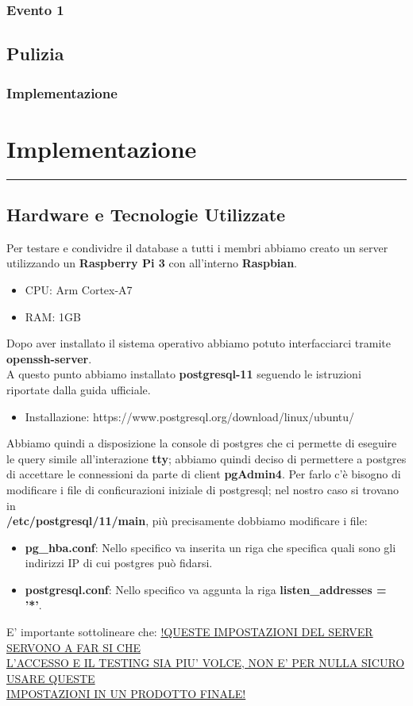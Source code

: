 \documentclass[legalpaper]{article}
\begin{document}
\subsubsection{Evento 1}
\subsection{Pulizia}
\subsubsection{Implementazione}
\newpage

\section{Implementazione}
\rule{\linewidth}{1.5pt}
\subsection{Hardware e Tecnologie Utilizzate}
Per testare e condividre il database a tutti i membri abbiamo creato un server utilizzando un \textbf{Raspberry Pi 3} con all'interno \textbf{Raspbian}.
\begin{itemize}
	\item CPU: Arm Cortex-A7
	\item RAM: 1GB
\end{itemize}
Dopo aver installato il sistema operativo abbiamo potuto interfacciarci tramite \textbf{openssh-server}.\\
A questo punto abbiamo installato \textbf{postgresql-11} seguendo le istruzioni riportate dalla guida ufficiale.
\begin{itemize}
	\item Installazione: https://www.postgresql.org/download/linux/ubuntu/
\end{itemize}
Abbiamo quindi a disposizione la console di postgres che ci permette di eseguire le query simile all'interazione \textbf{tty}; abbiamo quindi deciso di permettere a postgres di accettare le connessioni
da parte di client \textbf{pgAdmin4}.\newline
Per farlo c'è bisogno di modificare i file di conficurazioni iniziale di postgresql; nel nostro caso si trovano in \\ \textbf{/etc/postgresql/11/main},
più precisamente dobbiamo modificare i file:
\begin{itemize}
	\item \textbf{pg\_hba.conf}: Nello specifico va inserita un riga che specifica quali sono gli indirizzi IP di cui postgres può fidarsi.
	\item \textbf{postgresql.conf}: Nello specifico va aggunta la riga \textbf{listen\_addresses = '*'}.
\end{itemize}
E' importante sottolineare che: \underline{!QUESTE IMPOSTAZIONI DEL SERVER SERVONO A FAR SI CHE}\\ 
\underline{L'ACCESSO E IL TESTING SIA PIU' VOLCE, NON E' PER NULLA SICURO USARE QUESTE}\\
\underline{IMPOSTAZIONI IN UN PRODOTTO FINALE!}
\end{document}
